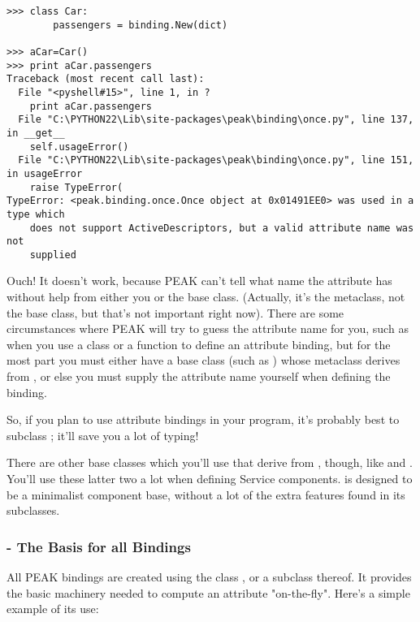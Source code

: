 \begin{verbatim}
>>> class Car:
        passengers = binding.New(dict)
	
>>> aCar=Car()
>>> print aCar.passengers
Traceback (most recent call last):
  File "<pyshell#15>", line 1, in ?
    print aCar.passengers
  File "C:\PYTHON22\Lib\site-packages\peak\binding\once.py", line 137, in __get__
    self.usageError()
  File "C:\PYTHON22\Lib\site-packages\peak\binding\once.py", line 151, in usageError
    raise TypeError(
TypeError: <peak.binding.once.Once object at 0x01491EE0> was used in a type which
    does not support ActiveDescriptors, but a valid attribute name was not
    supplied

\end{verbatim}

Ouch!  It doesn't work, because PEAK can't tell what name the attribute
has without help from either you or the base class.  (Actually, it's the
metaclass, not the base class, but that's not important right now).  There
are some circumstances where PEAK will try to guess the attribute name for you,
such as when you use a class or a  function to define an attribute binding, but
for the most part you must either have a base class (such as 
) whose metaclass derives from
, or else you must supply the attribute name
yourself when defining the binding.

So, if you plan to use attribute bindings in your program, it's probably best
to subclass ; it'll save you a lot of typing!

There are other  base classes which you'll use that
derive from , though, like  and
.  You'll use these latter two a lot when defining
Service components.   is designed to be a minimalist
component base, without a lot of the extra features found in its subclasses.




\subsubsection{ - The Basis for all Bindings}

All PEAK bindings are created using the class , or a
subclass thereof.  It provides the basic machinery needed to compute an
attribute "on-the-fly".  Here's a simple example of its use:

